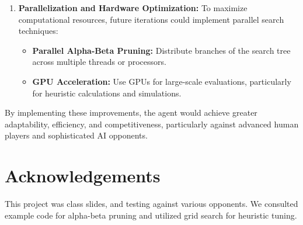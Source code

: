 \documentclass[11pt]{article}
\begin{document}
\begin{enumerate}
    \item \textbf{Parallelization and Hardware Optimization:}
    To maximize computational resources, future iterations could implement parallel search techniques:
    \begin{itemize}
        \item \textbf{Parallel Alpha-Beta Pruning:} Distribute branches of the search tree across multiple threads or processors.
        \item \textbf{GPU Acceleration:} Use GPUs for large-scale evaluations, particularly for heuristic calculations and simulations.
    \end{itemize}


\end{enumerate}

By implementing these improvements, the agent would achieve greater adaptability, efficiency, and competitiveness, particularly against advanced human players and sophisticated AI opponents.


\section*{Acknowledgements}
This project was class slides, and testing against various opponents. We consulted example code for alpha-beta pruning and utilized grid search for heuristic tuning.
\end{document}
